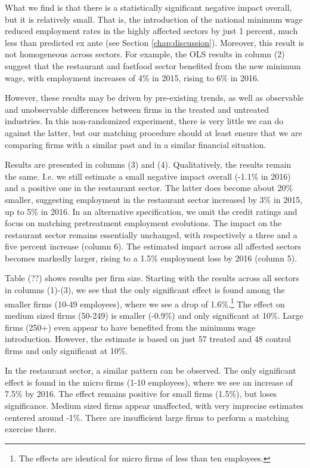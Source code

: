 What we find is that there is a statistically significant negative impact overall, but it is relatively small. That is, the introduction of the national minimum wage reduced employment rates in the highly affected sectors by just 1 percent, much less than predicted ex ante (see Section \ref{chap:discussion}). Moreover, this result is not homogeneous across sectors. For example, the OLS results in column (2) suggest that the restaurant and fastfood sector benefited from the new minimum wage, with employment increases of 4\% in 2015, rising to 6\% in 2016.

However, these results may be driven by pre-existing trends, as well as observable and unobservable differences between firms in the treated and untreated industries. In this non-randomized experiment, there is very little we can do against the latter, but our matching procedure should at least ensure that we are comparing firms with a similar past and in a similar financial situation. 

Results are presented in columns (3) and (4). Qualitatively, the results remain the same. I.e. we still estimate a small negative impact overall (-1.1\% in 2016) and a positive one in the restaurant sector. The latter does become about 20\% smaller, suggesting employment in the restaurant sector increased by 3\% in 2015, up to 5\% in 2016. In an alternative specification, we omit the credit ratings and focus on matching pretreatment employment evolutions. The impact on the restaurant sector remains essentially unchanged, with respectively a three and a five percent increase (column 6). The estimated impact across all affected sectors becomes markedly larger, rising to a 1.5\% employment loss by 2016 (column 5).


Table (??) shows results per firm size. Starting with the results across all sectors in columns (1)-(3), we see that the only significant effect is found among the smaller firms (10-49 employees), where we see a drop of 1.6\%.\footnote{The effects are identical for micro firms of less than ten employees.} The effect on medium sized firms (50-249) is smaller (-0.9\%) and only significant at 10\%. Large firms (250+) even appear to have benefited from the minimum wage introduction. However, the estimate is based on just 57 treated and 48 control firms and only significant at 10\%.

In the restaurant sector, a similar pattern can be observed. The only significant effect is found in the micro firms (1-10 employees), where we see an increase of 7.5\% by 2016. The effect remains positive for small firms (1.5\%), but loses significance. Medium sized firms appear unaffected, with very imprecise estimates centered around -1\%. There are insufficient large firms to perform a matching exercise there.
